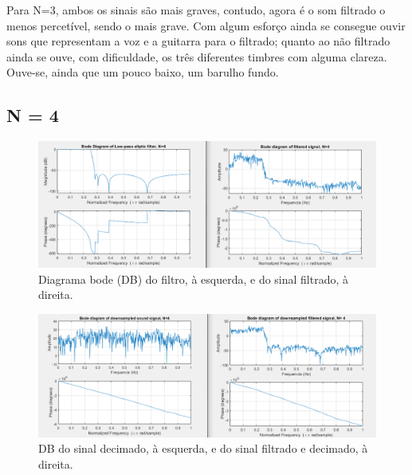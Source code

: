 \documentclass{article}
\begin{document}
\raggedright
\vspace{5mm} %

Para N=3, ambos os sinais são mais graves, contudo, agora é o som filtrado o menos percetível, sendo o mais grave. Com algum esforço ainda se consegue ouvir sons que representam a voz e a guitarra para o filtrado; quanto ao não filtrado ainda se ouve, com dificuldade, os três diferentes timbres com alguma clareza.
Ouve-se, ainda que um pouco baixo, um barulho fundo.

\newpage

\subsection{N = 4}
\vfill
\begin{figure}[h!]
\centering
\includegraphics[scale=0.5]{matlab_test_images/cut_images/fil8.PNG}
\caption{Diagrama bode (DB) do filtro, à esquerda, e do sinal filtrado, à direita.}
\label{fig:matlab_test_images/cut_images/fil8}
\end{figure}
\begin{figure}[h!]
\centering
\includegraphics[scale=0.5]{matlab_test_images/cut_images/fil9.PNG}
\caption{DB do sinal decimado, à esquerda, e do sinal filtrado e decimado, à direita.}
\label{fig:matlab_test_images/cut_images/fil9}
\end{figure}  
\newpage
\end{document}
